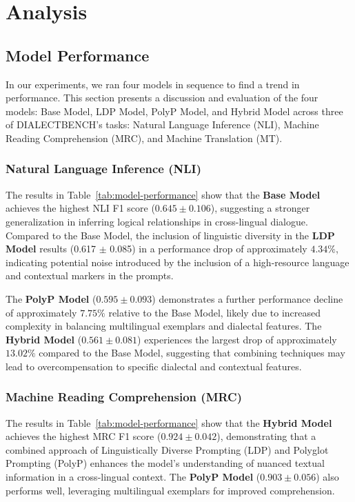 \section{Analysis}
\label{sec:analysis}

\subsection{Model Performance}

In our experiments, we ran four models in sequence to find a trend in performance. This section presents a discussion and evaluation of the four models: Base Model, LDP Model, PolyP Model, and Hybrid Model across three of  DIALECTBENCH's \cite{Faisal:24} tasks: Natural Language Inference (NLI), Machine Reading Comprehension (MRC), and Machine Translation (MT). 

\subsubsection{Natural Language Inference (NLI)}

The results in Table~\ref{tab:model-performance} show that the \textbf{Base Model} achieves the highest NLI F1 score (\(0.645 \pm 0.106\)), suggesting a stronger generalization in inferring logical relationships in cross-lingual dialogue. Compared to the Base Model, the inclusion of linguistic diversity in the \textbf{LDP Model} results (0.617 $\pm $ 0.085) in a performance drop of approximately \(4.34\%\), indicating potential noise introduced by the inclusion of a high-resource language and contextual markers in the prompts.

The \textbf{PolyP Model} (\(0.595 \pm 0.093\)) demonstrates a further performance decline of approximately \(7.75\%\) relative to the Base Model, likely due to increased complexity in balancing multilingual exemplars and dialectal features. The \textbf{Hybrid Model} (\(0.561 \pm 0.081\)) experiences the largest drop of approximately \(13.02\%\) compared to the Base Model, suggesting that combining techniques may lead to overcompensation to specific dialectal and contextual features.


\subsubsection{Machine Reading Comprehension (MRC)}

The results in Table~\ref{tab:model-performance} show that the \textbf{Hybrid Model} achieves the highest MRC F1 score (\(0.924 \pm 0.042\)), demonstrating that a combined approach of Linguistically Diverse Prompting (LDP) and Polyglot Prompting (PolyP) enhances the model's understanding of nuanced textual information in a cross-lingual context. The \textbf{PolyP Model} (\(0.903 \pm 0.056\)) also performs well, leveraging multilingual exemplars for improved comprehension.


